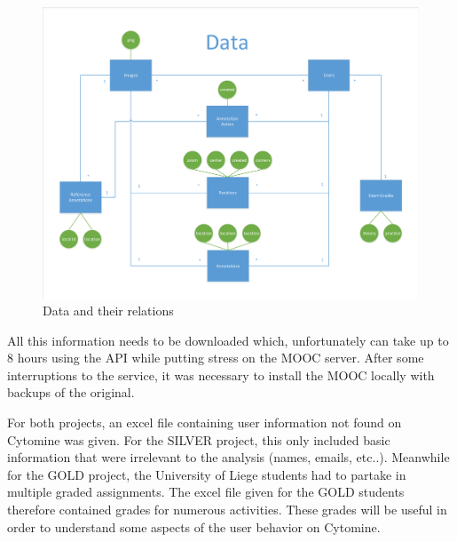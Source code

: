 \documentclass[a4paper,11pt]{report}
\numberwithin{figure}{section} %
\begin{document}
       \begin{figure}[H]
        \centering
         \includegraphics[width=.9\linewidth]{diagrams/dataDiagram.pdf}
         \caption{Data and their relations}
         \label{fig:data}
       \end{figure}


		All this information needs to be downloaded which, unfortunately can take up to 8 hours using the API while putting stress on the MOOC server.
		After some interruptions to the service, it was necessary to install the MOOC locally with backups of the original. \newline


        For both projects, an excel file containing user information not found on Cytomine was given.
        For the SILVER project, this only included basic information that were irrelevant to the analysis (names, emails, etc..).
        Meanwhile for the GOLD project, the University of Liege students had to partake in multiple graded assignments.
        The excel file given for the GOLD students therefore contained grades for numerous activities.
        These grades will be useful in order to understand some aspects of the user behavior on Cytomine. \newline
\end{document}
